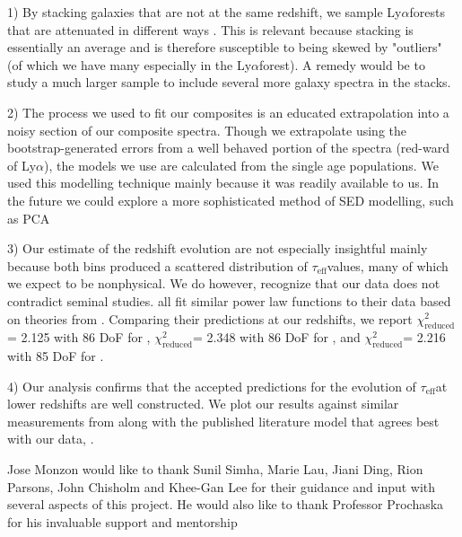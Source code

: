 \documentclass[preprint2,times,tighten]{aastex6}
\newcommand{\teff}{$\tau_\mathrm{eff}$\space}
\newcommand{\lya}{Ly$\alpha$\space}
\newcommand{\rchi}{$\chi^{2}_\mathrm{reduced}$}
\begin{document}
1) By stacking galaxies that are not at the same redshift, we sample \lya forests that are attenuated in different ways \cite{1965ApJ...142.1633G}. This is relevant because stacking is essentially an average and is therefore susceptible to being skewed by "outliers" (of which we have many especially in the \lya forest). A remedy would be to study a much larger sample to include several more galaxy spectra in the stacks. 

2) The process we used to fit our composites is an educated extrapolation into a noisy section of our composite spectra. Though we extrapolate using the bootstrap-generated errors from a well behaved portion of the spectra (red-ward of \lya), the models we use are calculated from the single age populations. We used this modelling technique mainly because it was readily available to us. In the future we could explore a more sophisticated method of SED modelling, such as PCA \citep{paris_principal_2011, Suzuki_2006}

3) Our estimate of the redshift evolution are not especially insightful mainly because both bins produced a scattered distribution of \teff values, many of which we expect to be nonphysical. We do however, recognize that our data does not contradict seminal studies. \cite{thomas_vimos_2017, faucher-giguere_direct_2008, becker_refined_2013} all fit similar power law functions to their data based on theories from \cite{1965ApJ...142.1633G}. Comparing their predictions at our redshifts, we report \rchi = 2.125 with 86 DoF for \cite{thomas_vimos_2017}, \rchi = 2.348 with 86 DoF for \cite{faucher-giguere_direct_2008}, and \rchi = 2.216 with 85 DoF for \cite{becker_refined_2013}.

4) Our analysis confirms that the accepted predictions for the evolution of \teff at lower redshifts are well constructed. We plot our results against similar measurements from \cite{schaye_metallicity_2003, kirkman_h_2005} along with the published literature model that agrees best with our data, \cite{becker_refined_2013}.

\begin{acknowledgements}
Jose Monzon would like to thank Sunil Simha, Marie Lau, Jiani Ding, Rion Parsons, John Chisholm and Khee-Gan Lee for their guidance and input with several aspects of this project. He would also like to thank Professor Prochaska for his invaluable support and mentorship
\end{acknowledgements}

\newpage
\end{document}
